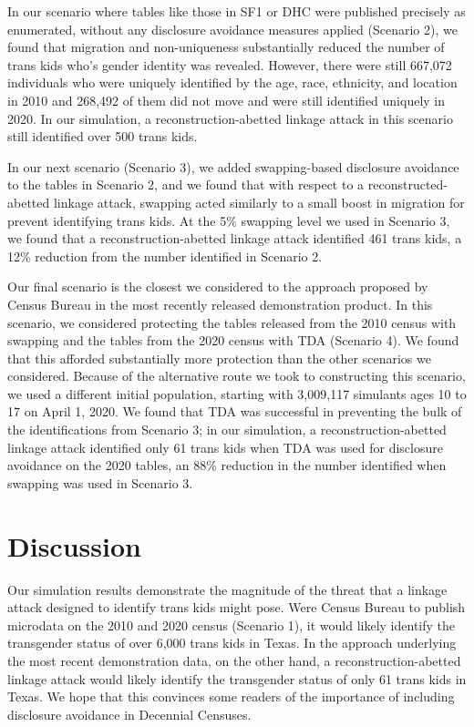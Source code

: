 \documentclass{jpc} %
\theoremstyle{plain}\newtheorem{satz}[thm]{Satz} %
\begin{document}
In our scenario where tables like those in SF1 or DHC were published precisely as enumerated, without any disclosure avoidance measures applied (Scenario 2), we found that migration and non-uniqueness substantially reduced the number of trans kids who's gender identity was revealed.  However, there were still 667,072 individuals who were uniquely identified by the age, race, ethnicity, and location in 2010 and 268,492 of them did not move and were still identified uniquely in 2020.  In our simulation, a reconstruction-abetted linkage attack in this scenario still identified over 500 trans kids.

In our next scenario (Scenario 3), we added swapping-based disclosure avoidance to the tables in Scenario 2, and we found that with respect to a reconstructed-abetted linkage attack, swapping acted similarly to a small boost in migration for prevent identifying trans kids.  At the 5\% swapping level we used in Scenario 3, we found that a reconstruction-abetted linkage attack identified 461 trans kids, a 12\% reduction from the number identified in Scenario 2.

Our final scenario is the closest we considered to the approach proposed by Census Bureau in the most recently released demonstration product. In this scenario, we considered protecting the tables released from the 2010 census with swapping and the tables from the 2020 census with TDA (Scenario 4).  We found that this afforded substantially more protection than the other scenarios we considered.  Because of the alternative route we took to constructing this scenario, we used a different initial population, starting with 3,009,117 simulants ages 10 to 17 on April 1, 2020.  We found that TDA was successful in preventing the bulk of the identifications from Scenario 3; in our simulation, a reconstruction-abetted linkage attack identified only 61 trans kids when TDA was used for disclosure avoidance on the 2020 tables, an 88\% reduction in the number identified when swapping was used in Scenario 3.

\section{Discussion}

Our simulation results demonstrate the magnitude of the threat that a linkage attack designed to identify trans kids might pose.  Were Census Bureau to publish microdata on the 2010 and 2020 census (Scenario 1), it would likely identify the transgender status of over 6,000 trans kids in Texas.  In the approach underlying the most recent demonstration data, on the other hand, a reconstruction-abetted linkage attack would likely identify the transgender status of only 61 trans kids in Texas.  We hope that this convinces some readers of the importance of including disclosure avoidance in Decennial Censuses.
\end{document}
